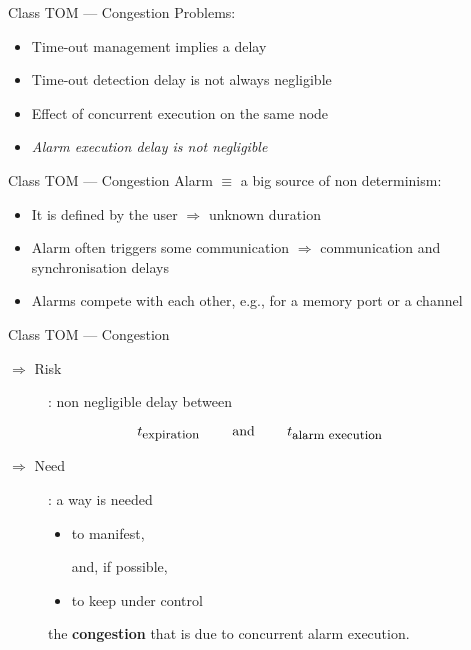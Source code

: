 \begin{frame}[fragile]{Class TOM --- Congestion}
\noindent
Problems:

\vspace{20pt}

\begin{itemize}
\item Time-out management implies a delay
\item Time-out detection delay is not always negligible
\item Effect of concurrent execution on the same node
\item \emph{Alarm execution delay is not negligible}
\end{itemize}




\end{frame}
\begin{frame}[fragile]{Class TOM --- Congestion}
\noindent
Alarm $\equiv$ a big source of non determinism:

\vspace{20pt}

\begin{itemize}
  \item It is defined by the user $\Rightarrow$ unknown duration
  \item Alarm often triggers some communication $\Rightarrow$ communication and
	synchronisation delays
  \item Alarms compete with each other, e.g., for a memory port or a channel
\end{itemize}
\end{frame}
\begin{frame}[fragile]{Class TOM --- Congestion}
\begin{description}
\item[$\Rightarrow$ Risk]: non negligible delay between
\end{description}


\vspace{20pt}

\[
     t_{\hbox{\small expiration}} \qquad \hbox{ and } \qquad t_{\hbox{\small alarm execution}}
\]


\vspace{20pt}

\begin{description}
\item[$\Rightarrow$ Need]: a way is needed

     \begin{itemize}
     \item to manifest, \ 
     
     \hspace*{50pt} and, if possible,
     \item to keep under control
     \end{itemize} 
     the \textbf{congestion} that is due to concurrent alarm execution.
\end{description}




\end{frame}

